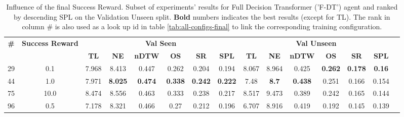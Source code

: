 \begin{table}
\centering
\caption{\label{tab:f_dt_reward_scale}Influence of the final Success Reward. Subset of experiments' results for Full Decision Transformer ('F-DT') agent and ranked by descending SPL on the Validation Unseen split. \textbf{Bold} numbers indicates the best results (except for TL). The rank in column \# is also used as a look up id in table \ref{tab:all-configs-final} to link the corresponding training configuration.}
\begin{tabular}{@{\hskip3pt}c@{\hskip3pt}c@{\hskip3pt}c@{\hskip3pt}c@{\hskip3pt}c@{\hskip3pt}c@{\hskip3pt}c@{\hskip3pt}c@{\hskip3pt}c@{\hskip3pt}c@{\hskip3pt}c@{\hskip3pt}c@{\hskip3pt}c@{\hskip3pt}c@{\hskip3pt}c}
\toprule
                                  \textbf{\#} & \textbf{Success Reward } & \multicolumn{6}{c}{\textbf{Val Seen}} & \multicolumn{6}{c}{\textbf{Val Unseen}} \\
\cmidrule(l){3-8}\cmidrule(l){9-14}\textbf{~} &               \textbf{~} &       \textbf{TL} &     \textbf{NE} &   \textbf{nDTW} &     \textbf{OS} &     \textbf{SR} &    \textbf{SPL} &         \textbf{TL} &   \textbf{NE} &   \textbf{nDTW} &     \textbf{OS} &     \textbf{SR} &   \textbf{SPL} \\
\midrule
                                           29 &                      0.1 &             7.968 &           8.413 &           0.447 &           0.262 &           0.204 &           0.194 &               8.067 &         8.964 &           0.425 &  \textbf{0.262} &  \textbf{0.178} &  \textbf{0.16} \\
                                           44 &                      1.0 &             7.971 &  \textbf{8.025} &  \textbf{0.474} &  \textbf{0.338} &  \textbf{0.242} &  \textbf{0.222} &                7.48 &  \textbf{8.7} &  \textbf{0.438} &           0.251 &           0.166 &          0.154 \\
                                           75 &                     10.0 &             8.474 &           8.556 &           0.463 &           0.333 &           0.238 &           0.217 &               8.517 &         9.473 &           0.389 &           0.242 &           0.165 &          0.144 \\
                                           96 &                      0.5 &             7.178 &           8.321 &           0.466 &            0.27 &           0.212 &           0.196 &               6.707 &         8.916 &           0.419 &           0.192 &           0.145 &          0.139 \\
\bottomrule
\end{tabular}
\end{table}
